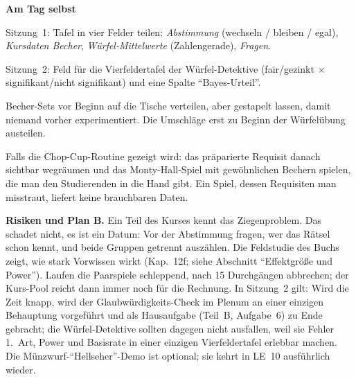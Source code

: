 \begin{vorbereitung}
\textbf{Am Tag selbst}
\begin{checkliste}
  \item Sitzung~1: Tafel in vier Felder teilen: \emph{Abstimmung}
    (wechseln / bleiben / egal), \emph{Kursdaten Becher},
    \emph{Würfel-Mittelwerte} (Zahlengerade), \emph{Fragen}.
  \item Sitzung~2: Feld für die Vierfeldertafel der Würfel-Detektive
    (fair/gezinkt $\times$ signifikant/nicht signifikant) und eine Spalte
    \enquote{Bayes-Urteil}.
  \item Becher-Sets vor Beginn auf die Tische verteilen, aber gestapelt
    lassen, damit niemand vorher experimentiert. Die Umschläge erst zu
    Beginn der Würfelübung austeilen.
  \item Falls die Chop-Cup-Routine gezeigt wird: das präparierte Requisit
    danach sichtbar wegräumen und das Monty-Hall-Spiel mit gewöhnlichen
    Bechern spielen, die man den Studierenden in die Hand gibt. Ein Spiel,
    dessen Requisiten man misstraut, liefert keine brauchbaren Daten.
\end{checkliste}

\textbf{Risiken und Plan B.} Ein Teil des Kurses kennt das
Ziegenproblem. Das schadet nicht, es ist ein Datum: Vor der
Abstimmung fragen, wer das Rätsel schon kennt, und beide Gruppen
getrennt auszählen. Die Feldstudie des Buchs zeigt, wie stark Vorwissen
wirkt (Kap.~12f; siehe Abschnitt \enquote{Effektgröße und Power}).
Laufen die Paarspiele schleppend, nach 15 Durchgängen abbrechen; der
Kurs-Pool reicht dann immer noch für die Rechnung. In Sitzung~2 gilt:
Wird die Zeit knapp, wird der Glaubwürdigkeits-Check im Plenum an einer
einzigen Behauptung vorgeführt und als Hausaufgabe (Teil~B, Aufgabe~6) zu
Ende gebracht; die Würfel-Detektive sollten dagegen nicht ausfallen, weil
sie Fehler 1.~Art, Power und Basisrate in einer einzigen Vierfeldertafel
erlebbar machen. Die Münzwurf-\enquote{Hellseher}-Demo ist optional; sie
kehrt in LE~10 ausführlich wieder.
\end{vorbereitung}

